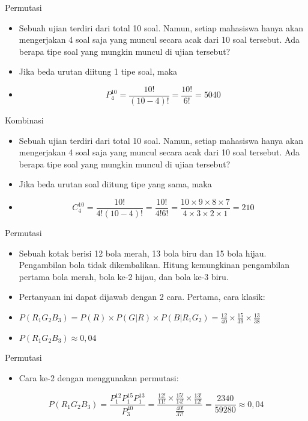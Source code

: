 \documentclass[
  ignorenonframetext,
]{beamer}
\providecommand{\tightlist}{%
  \setlength{\itemsep}{0pt}\setlength{\parskip}{0pt}}\usepackage{longtable,booktabs,array}
\begin{document}
\begin{frame}{Permutasi}
\label{permutasi}
\begin{itemize}[<+->]
\item
  Sebuah ujian terdiri dari total 10 soal. Namun, setiap mahasiswa hanya
  akan mengerjakan 4 soal saja yang muncul secara acak dari 10 soal
  tersebut. Ada berapa tipe soal yang mungkin muncul di ujian tersebut?
\item
  Jika beda urutan diitung 1 tipe soal, maka
\item
  \[P^{10}_4=\frac{10!}{(10-4)!}=\frac{10!}{6!}=5040\]
\end{itemize}
\end{frame}

\begin{frame}{Kombinasi}
\label{kombinasi}
\begin{itemize}[<+->]
\item
  Sebuah ujian terdiri dari total 10 soal. Namun, setiap mahasiswa hanya
  akan mengerjakan 4 soal saja yang muncul secara acak dari 10 soal
  tersebut. Ada berapa tipe soal yang mungkin muncul di ujian tersebut?
\item
  Jika beda urutan soal diitung tipe yang sama, maka
\item
  \[C^{10}_4=\frac{10!}{4!(10-4)!}=\frac{10!}{4!6!}=\frac{10\times9\times 8\times 7}{4 \times 3\times 2\times 1}=210\]
\end{itemize}
\end{frame}

\begin{frame}{Permutasi}
\label{permutasi-1}
\begin{itemize}[<+->]
\item
  Sebuah kotak berisi 12 bola merah, 13 bola biru dan 15 bola hijau.
  Pengambilan bola tidak dikembalikan. Hitung kemungkinan pengambilan
  pertama bola merah, bola ke-2 hijau, dan bola ke-3 biru.
\item
  Pertanyaan ini dapat dijawab dengan 2 cara. Pertama, cara klasik:
\item
  \(P(R_1G_2B_3)=P(R) \times P(G|R) \times P(B|R_1G_2)=\frac{12}{40} \times \frac{15}{39} \times \frac{13}{38}\)
\item
  \(P(R_1G_2B_3) \approx 0,04\)
\end{itemize}
\end{frame}

\begin{frame}{Permutasi}
\label{permutasi-2}
\begin{itemize}
\tightlist
\item
  Cara ke-2 dengan menggunakan permutasi:
\end{itemize}

\[
P(R_1G_2B_3)=\frac{P^{12}_1P^{15}_1P^{13}_1}{P^{40}_3}=\frac{\frac{12!}{11!}\times\frac{15!}{14!}\times\frac{13!}{12!}}{\frac{40!}{37!}}=\frac{2340}{59280} \approx 0,04
\]
\end{frame}
\end{document}

